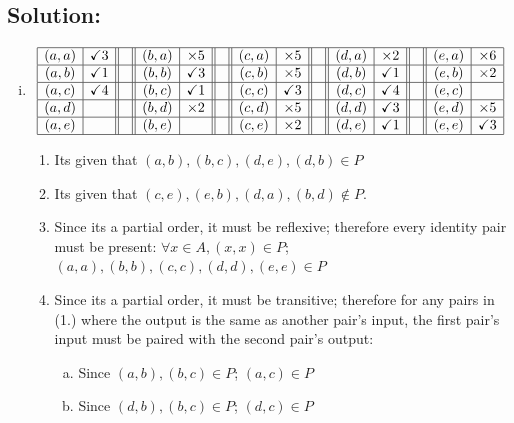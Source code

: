 \documentclass[12pt]{article}
\begin{document}
	\subsection*{\textbf{Solution:}}
	\begin{enumerate}[(i)]
		\item
			\[
				\begin{array}{|c|c||c||c|c||c||c|c||c||c|c||c||c|c|}
					\hline
					(a,a) & \checkmark3 &  & (b,a) & \times 5    &  & (c,a) & \times 5    &  & (d,a) & \times 2    &  & (e,a) & \times 6    \\
					\hline
					(a,b) & \checkmark1 &  & (b,b) & \checkmark3 &  & (c,b) & \times 5    &  & (d,b) & \checkmark1 &  & (e,b) & \times 2    \\
					\hline
					(a,c) & \checkmark4 &  & (b,c) & \checkmark1 &  & (c,c) & \checkmark3 &  & (d,c) & \checkmark4 &  & (e,c) &             \\
					\hline
					(a,d) &             &  & (b,d) & \times 2    &  & (c,d) & \times 5    &  & (d,d) & \checkmark3 &  & (e,d) & \times 5    \\
					\hline
					(a,e) &             &  & (b,e) &             &  & (c,e) & \times 2    &  & (d,e) & \checkmark1 &  & (e,e) & \checkmark3 \\
					\hline
				\end{array}
			\]
			\begin{enumerate}[1.]
				\item Its given that $(a,b),(b,c),(d,e),(d,b) \in P$

				\item Its given that $(c,e),(e,b),(d,a),(b,d) \not\in P.$

				\item Since its a partial order, it must be reflexive; therefore every identity
					pair must be present: $\forall x \in A, (x,x) \in P$; $(a,a),(b,b),(c,c
					),(d,d),(e,e) \in P$

				\item Since its a partial order, it must be transitive; therefore for any
					pairs in (1.) where the output is the same as another pair's input,
					the first pair's input must be paired with the second pair's output:
					\begin{enumerate}[a.]
						\item Since $(a,b),(b,c) \in P$; $(a,c) \in P$

						\item Since $(d,b),(b,c) \in P$; $(d,c) \in P$
					\end{enumerate}


\end{enumerate}
\end{enumerate}
\end{document}
